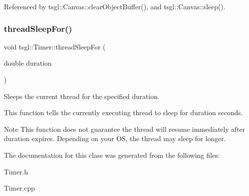 Referenced by tsgl\+::\+Canvas\+::clear\+Object\+Buffer(), and tsgl\+::\+Canvas\+::sleep().

\mbox{\label{classtsgl_1_1_timer_ae8c5b39a6c5cae2a24abe2a298b05b64}} 
\subsubsection{\texorpdfstring{thread\+Sleep\+For()}{threadSleepFor()}}
{\footnotesize\ttfamily void tsgl\+::\+Timer\+::thread\+Sleep\+For (\begin{DoxyParamCaption}\item[{double}]{duration }\end{DoxyParamCaption})\hspace{0.3cm}{\ttfamily [static]}}



Sleeps the current thread for the specified duration. 

This function tells the currently executing thread to sleep for {\ttfamily duration} seconds. \begin{DoxyNote}{Note}
This function does not guarantee the thread will resume immediately after {\ttfamily duration} expires. Depending on your OS, the thread may sleep for longer. 
\end{DoxyNote}


The documentation for this class was generated from the following files\+:\begin{DoxyCompactItemize}
\item 
Timer.\+h\item 
Timer.\+cpp\end{DoxyCompactItemize}
